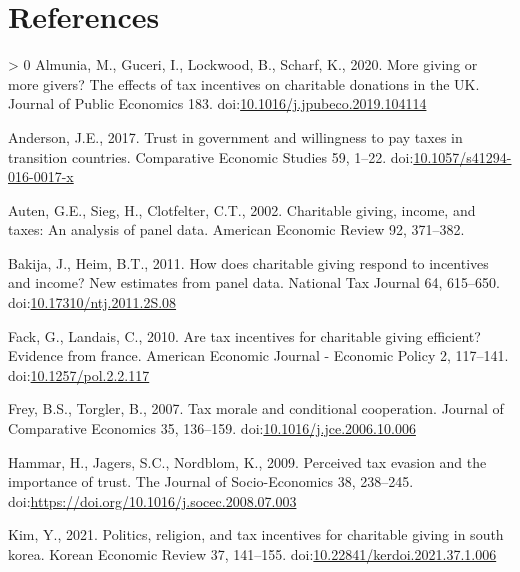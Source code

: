 \documentclass[ review  , 3p ]{elsarticle}
\newlength{\cslhangindent}
\newenvironment{CSLReferences}[3] %
 {%
  \setlength{\parindent}{0pt}
  \ifodd #1 \everypar{\setlength{\hangindent}{\cslhangindent}}\ignorespaces\fi
  \ifnum #2 > 0
  \setlength{\parskip}{#2\baselineskip}
  \fi
 }%
 {}
\begin{document}
  \clearpage

  \hypertarget{references}{%
  \section*{References}\label{references}}

  \hypertarget{refs}{}
  \begin{CSLReferences}{1}{0}
  \leavevmode\hypertarget{ref-Almunia2020}{}%
  Almunia, M., Guceri, I., Lockwood, B., Scharf, K., 2020. More giving or more givers? The effects of tax incentives on charitable donations in the UK. Journal of Public Economics 183. doi:\href{https://doi.org/10.1016/j.jpubeco.2019.104114}{10.1016/j.jpubeco.2019.104114}

  \leavevmode\hypertarget{ref-Anderson2017}{}%
  Anderson, J.E., 2017. Trust in government and willingness to pay taxes in transition countries. Comparative Economic Studies 59, 1--22. doi:\href{https://doi.org/10.1057/s41294-016-0017-x}{10.1057/s41294-016-0017-x}

  \leavevmode\hypertarget{ref-Auten2002}{}%
  Auten, G.E., Sieg, H., Clotfelter, C.T., 2002. Charitable giving, income, and taxes: An analysis of panel data. American Economic Review 92, 371--382.

  \leavevmode\hypertarget{ref-Bakija2011}{}%
  Bakija, J., Heim, B.T., 2011. How does charitable giving respond to incentives and income? New estimates from panel data. National Tax Journal 64, 615--650. doi:\href{https://doi.org/10.17310/ntj.2011.2S.08}{10.17310/ntj.2011.2S.08}

  \leavevmode\hypertarget{ref-Fack2010}{}%
  Fack, G., Landais, C., 2010. Are tax incentives for charitable giving efficient? Evidence from france. American Economic Journal - Economic Policy 2, 117--141. doi:\href{https://doi.org/10.1257/pol.2.2.117}{10.1257/pol.2.2.117}

  \leavevmode\hypertarget{ref-Frey2007}{}%
  Frey, B.S., Torgler, B., 2007. Tax morale and conditional cooperation. Journal of Comparative Economics 35, 136--159. doi:\href{https://doi.org/10.1016/j.jce.2006.10.006}{10.1016/j.jce.2006.10.006}

  \leavevmode\hypertarget{ref-Hammar2009}{}%
  Hammar, H., Jagers, S.C., Nordblom, K., 2009. Perceived tax evasion and the importance of trust. The Journal of Socio-Economics 38, 238--245. doi:\url{https://doi.org/10.1016/j.socec.2008.07.003}

  \leavevmode\hypertarget{ref-Kim2021}{}%
  Kim, Y., 2021. Politics, religion, and tax incentives for charitable giving in south korea. Korean Economic Review 37, 141--155. doi:\href{https://doi.org/10.22841/kerdoi.2021.37.1.006}{10.22841/kerdoi.2021.37.1.006}


\end{CSLReferences}
\end{document}
